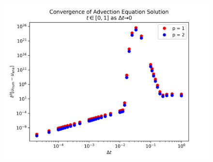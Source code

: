 \documentclass[10pt, reqno]{amsart}
\begin{document}
\begin{multicols}{2}
\begin{figure}[H]
    \centering
    \includegraphics[width = 1\linewidth]{advection_convergence.png}
\end{figure}


\end{multicols}
\end{document}

